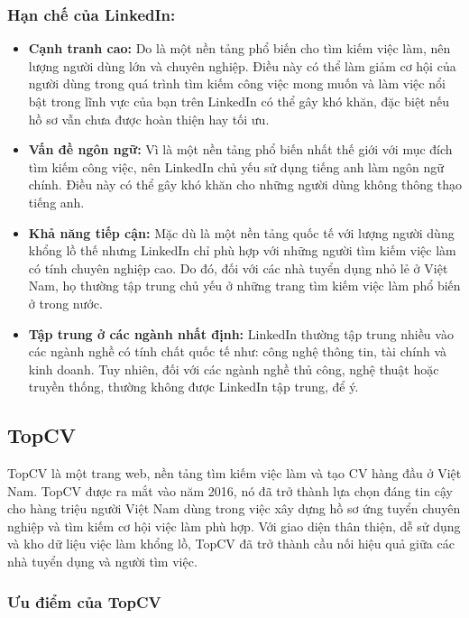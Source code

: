 \subsubsection{Hạn chế của LinkedIn:}

\begin{itemize}
	\item \textbf{Cạnh tranh cao:} Do là một nền tảng phổ biến cho tìm kiếm việc làm, nên lượng người dùng lớn và chuyên nghiệp. Điều này có thể làm giảm cơ hội của người dùng trong quá trình tìm kiếm công việc mong muốn và làm việc nổi bật trong lĩnh vực của bạn trên LinkedIn có thể gây khó khăn, đặc biệt nếu hồ sơ vẫn chưa được hoàn thiện hay tối ưu.
	\item \textbf{Vấn đề ngôn ngữ:} Vì là một nền tảng phổ biến nhất thế giới với mục đích tìm kiếm công việc, nên LinkedIn chủ yếu sử dụng tiếng anh làm ngôn ngữ chính. Điều này có thể gây khó khăn cho những người dùng không thông thạo tiếng anh. 
	\item \textbf{Khả năng tiếp cận:} Mặc dù là một nền tảng quốc tế với lượng người dùng khổng lồ thế nhưng LinkedIn chỉ phù hợp với những người tìm kiếm việc làm có tính chuyên nghiệp cao. Do đó, đối với các nhà tuyển dụng nhỏ lẻ ở Việt Nam, họ thường tập trung chủ yếu ở những trang tìm kiếm việc làm phổ biến ở trong nước.
	\item \textbf{Tập trung ở các ngành nhất định:} LinkedIn thường tập trung nhiều vào các ngành nghề có tính chất quốc tế như: công nghệ thông tin, tài chính và kinh doanh. Tuy nhiên, đối với các ngành nghề thủ công, nghệ thuật hoặc truyền thống, thường không được LinkedIn tập trung, để ý. 
\end{itemize}

\subsection{TopCV}

TopCV là một trang web, nền tảng tìm kiếm việc làm và tạo CV hàng đầu ở Việt Nam. TopCV được ra mắt vào năm 2016, nó đã trở thành lựa chọn đáng tin cậy cho hàng triệu người Việt Nam dùng trong việc xây dựng hồ sơ ứng tuyển chuyên nghiệp và tìm kiếm cơ hội việc làm phù hợp. Với giao diện thân thiện, dễ sử dụng và kho dữ liệu việc làm khổng lồ, TopCV đã trở thành cầu nối hiệu quả giữa các nhà tuyển dụng và người tìm việc.

\subsubsection{Ưu điểm của TopCV}

